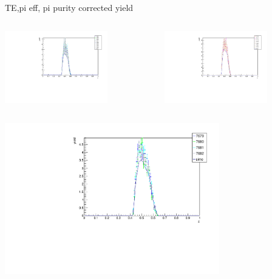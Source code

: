 \begin{frame}{TE,pi eff, pi purity corrected yield}
\begin{columns}
\begin{column}[T]{0.5\textwidth}
\includegraphics[width = 0.7\textwidth]{results/yield/check/yieldcheck_480_neg.pdf}
\end{column}
\begin{column}[T]{0.5\textwidth}
\includegraphics[width = 0.7\textwidth]{results/yield/check/yieldcheck_480_pos.pdf}
\end{column}
\end{columns}
\begin{columns}
\begin{column}[T]{0.5\textwidth}
\includegraphics[width = 0.7\textwidth]{results/yield/check/yieldcheck_470_neg.pdf}

\end{column}
\end{columns}
\end{frame}
